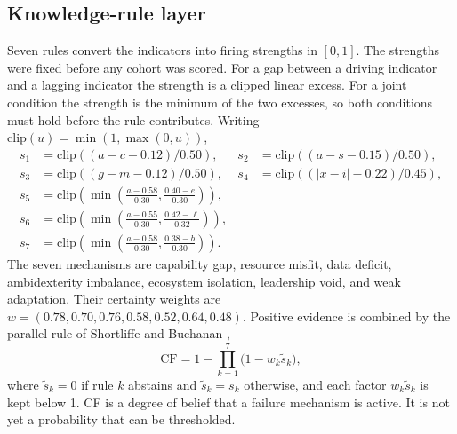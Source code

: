 \documentclass[preprint,12pt]{elsarticle}
\begin{document}
\subsection{Knowledge-rule layer}
Seven rules convert the indicators into firing strengths in $[0,1]$. The strengths were fixed before any cohort was scored. For a gap between a driving indicator and a lagging indicator the strength is a clipped linear excess. For a joint condition the strength is the minimum of the two excesses, so both conditions must hold before the rule contributes. Writing $\mathrm{clip}(u)=\min(1,\max(0,u))$,
\begin{equation}
\begin{aligned}
s_1 &= \mathrm{clip}((a-c-0.12)/0.50), &
s_2 &= \mathrm{clip}((a-s-0.15)/0.50), \\
s_3 &= \mathrm{clip}((g-m-0.12)/0.50), &
s_4 &= \mathrm{clip}((|x-i|-0.22)/0.45), \\
s_5 &= \mathrm{clip}\!\left(\min\!\left(\tfrac{a-0.58}{0.30},\tfrac{0.40-e}{0.30}\right)\right), \\
s_6 &= \mathrm{clip}\!\left(\min\!\left(\tfrac{a-0.55}{0.30},\tfrac{0.42-\ell}{0.32}\right)\right), \\
s_7 &= \mathrm{clip}\!\left(\min\!\left(\tfrac{a-0.58}{0.30},\tfrac{0.38-b}{0.30}\right)\right).
\end{aligned}
\label{eq:rules}
\end{equation}
The seven mechanisms are capability gap, resource misfit, data deficit, ambidexterity imbalance, ecosystem isolation, leadership void, and weak adaptation. Their certainty weights are $w=(0.78,0.70,0.76,0.58,0.52,0.64,0.48)$. Positive evidence is combined by the parallel rule of Shortliffe and Buchanan \cite{shortliffe1975},
\begin{equation}
\mathrm{CF} = 1 - \prod_{k=1}^{7}\bigl(1 - w_k \tilde{s}_k\bigr),
\label{eq:cf}
\end{equation}
where $\tilde{s}_k=0$ if rule $k$ abstains and $\tilde{s}_k=s_k$ otherwise, and each factor $w_k\tilde{s}_k$ is kept below 1. CF is a degree of belief that a failure mechanism is active. It is not yet a probability that can be thresholded.
\end{document}
